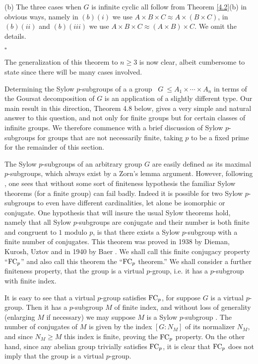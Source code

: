 \documentclass[11pt]{article}
\theoremstyle{change}
\newcommand{\<}{\langle}
\renewcommand{\>}{\rangle}
\newcommand{\qed}{\quad\hfill$\square$}
\newcommand{\syl}{Sylow $p$-subgroup }
\newcommand{\syls}{Sylow $p$-subgroups }
\begin{document}
(b) The three cases when $G$ is infinite cyclic all follow from Theorem \ref{4.2}(b) in obvious ways, namely in $(b)(i)$ we use $A\times B\times C\approx A\times (B\times C)$, in $(b)(ii)$ and $(b)(iii)$ we use $A\times B\times C\approx (A\times B)\times C$. We omit the details.

\qed

The generalization of this theorem to $n\geq 3$ is now clear, albeit cumbersome to state since
there will be many cases involved. 


\smallskip

Determining the \syls  of a a group \ $G\ \leq A_1\times\cdots \times A_n$ in terms of the Goursat
decomposition of $G$ is an application of a slightly different type. Our main result in this 
direction, Theorem 4.8 below, gives a very simple and natural answer to this question, and not only for
finite groups but for certain classes of infinite groups. We therefore commence with a brief
discussion of \syls for groups that are not necessarily finite, taking $p$ to be a fixed prime
for the remainder of this section.

The \syls of an arbitrary group $G$ are easily defined as its maximal $p$-subgroups, which always exist by a Zorn's lemma argument. However,
following \cite[Section 14.3]{Robinson}, one sees that without some sort of
finiteness hypothesis the familiar Sylow theorems (for a finite group) can fail
badly. Indeed it is possible for two \syls to even have different cardinalities, let alone be isomorphic or conjugate. One hypothesis that will insure the
usual Sylow theorems hold, namely that all \syls are conjugate and their number is
both finite and congruent to $1$ modulo $p$, is that there exists a \syl with
a finite number of conjugates. This theorem was proved in 1938 by
Dieman, Kurosh, Uztov \cite{Dieman}  and in 1940 by Baer \cite{Baer} . We shall 
call this finite conjugacy
property ``${\rm FC}_p$'' and also call this theorem the ``${\rm FC}_p$  theorem.''  We shall consider a further finiteness property, that the group
is a virtual $p$-group, i.e. it has a $p$-subgroup with finite index.     

  It is easy to see that a virtual $p$-group satisfies ${\rm FC}_p$, for suppose $G$ is a virtual
  $p$-group. Then
it has a $p$-subgroup $M$ of finite index, and without loss of generality (enlarging $M$ if necessary) we
may suppose $M$ is a \syl. The number of conjugates of $M$ is given by the index $[G:N_M]$ of its
normalizer $N_M$, and since 
$N_M \geq M$ this index is finite, proving the ${\rm FC}_p$ property. On the other 
hand, since any abelian group
trivially satisfies ${\rm FC}_p$, it is clear that ${\rm FC}_p$ does not imply that the group is
a virtual $p$-group.
\end{document}
